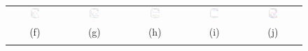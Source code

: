 \documentclass{IEEEtran}
\begin{document}
\begin{figure}[t]
\begin{tabular}{@{}c c c c c@{}}
\includegraphics[width=0.18\textwidth]{figs/synthetic/syn_lines_gabor_scales_0} &
\includegraphics[width=0.18\textwidth]{figs/synthetic/syn_lines_gabor_scales_1} &
\includegraphics[width=0.18\textwidth]{figs/synthetic/syn_lines_gabor_scales_2} &
\includegraphics[width=0.18\textwidth]{figs/synthetic/syn_lines_gabor_scales_3} &
\includegraphics[width=0.18\textwidth]{figs/retina/ret_vessels_gabor_scales} \\
(f) & (g) & (h) & (i) & (j)\\
\noalign{\smallskip}


\end{tabular}
\end{figure}
\end{document}
